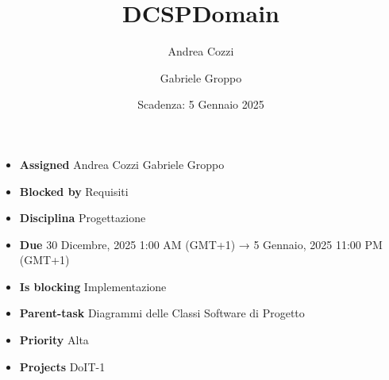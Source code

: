 \title{DCSPDomain}
\author{Andrea Cozzi \and Gabriele Groppo}
\date{Scadenza: 5 Gennaio 2025}

\maketitle

\begin{itemize}
    \item \textbf{Assigned} Andrea Cozzi Gabriele Groppo
    \item \textbf{Blocked by} Requisiti
    \item \textbf{Disciplina} Progettazione
    \item \textbf{Due} 30 Dicembre, 2025 1:00 AM (GMT+1) → 5 Gennaio, 2025 11:00 PM (GMT+1)
    \item \textbf{Is blocking} Implementazione
    \item \textbf{Parent-task} Diagrammi delle Classi Software di Progetto
    \item \textbf{Priority} Alta
    \item \textbf{Projects} DoIT-1
\end{itemize}